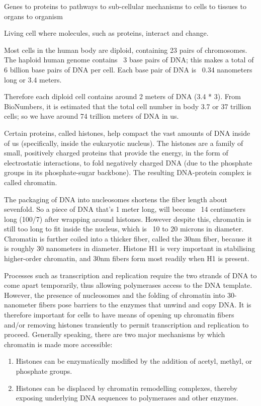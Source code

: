 Genes to proteins to pathways to sub-cellular mechanisms to cells to tissues to organs to organism

Living cell where molecules, such as proteins, interact and change.

Most cells in the human body are diploid, containing 23 pairs of chromosomes. The haploid human genome contains ~3 base pairs of DNA; this makes a total of 6 billion base pairs of DNA per cell. Each base pair of DNA is ~0.34 nanometers long or 3.4 meters\cite{pmid7354864}.

Therefore each diploid cell contains around 2 meters of DNA (3.4 * 3). From BioNumbers\cite{pmid23829164}, it is estimated that the total cell number in body 3.7 or 37 trillion cells; so we have around 74 trillion meters of DNA in us.

Certain proteins, called histones, help compact the vast amounts of DNA inside of us (specifically, inside the eukaryotic nucleus). The histones are a family of small, positively charged proteins that provide the energy, in the form of electrostatic interactions, to fold negatively charged DNA (due to the phosphate groups in its phosphate-sugar backbone). The resulting DNA-protein complex is called chromatin.

The packaging of DNA into nucleosomes shortens the fiber length about sevenfold. So a piece of DNA that's 1 meter long, will become ~14 centimeters long (100/7) after wrapping around histones. However despite this, chromatin is still too long to fit inside the nucleus, which is ~10 to 20 microns in diameter. Chromatin is further coiled into a thicker fiber, called the 30nm fiber, because it is roughly 30 nanometers in diameter. Histone H1 is very important in stabilising higher-order chromatin, and 30nm fibers form most readily when H1 is present.

Processes such as transcription and replication require the two strands of DNA to come apart temporarily, thus allowing polymerases access to the DNA template. However, the presence of nucleosomes and the folding of chromatin into 30-nanometer fibers pose barriers to the enzymes that unwind and copy DNA. It is therefore important for cells to have means of opening up chromatin fibers and/or removing histones transiently to permit transcription and replication to proceed. Generally speaking, there are two major mechanisms by which chromatin is made more accessible:

\begin{enumerate}
   \item Histones can be enzymatically modified by the addition of acetyl, methyl, or phosphate groups.
   \item Histones can be displaced by chromatin remodelling complexes, thereby exposing underlying DNA sequences to polymerases and other enzymes.
\end{enumerate}

